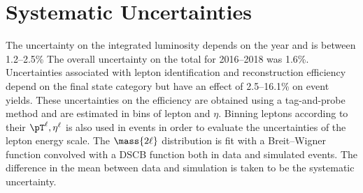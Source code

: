 \section{Systematic Uncertainties}
\label{sec:syst_uncert_dilep}
The uncertainty on the integrated luminosity depends on the year and is between 1.2--2.5\% %
The overall uncertainty on the total \lumiint for 2016--2018 was 1.6\%. %
Uncertainties associated with lepton identification and reconstruction efficiency depend on the final state category but have an effect of 2.5--16.1\% on event yields.
These uncertainties on the efficiency are obtained using a tag-and-probe method and are estimated in bins of lepton \pT and $\eta$.
Binning leptons according to their $\pT^\ell, \eta^\ell$ is also used in \ztolplm events in order to evaluate the uncertainties of the lepton energy scale.
The $\mass{2\ell}$ distribution is fit with a Breit--Wigner function convolved with a DSCB function both in data and simulated events.
The difference in the mean between data and simulation is taken to be the systematic uncertainty. %

